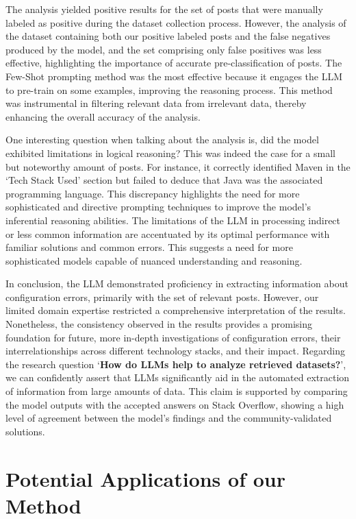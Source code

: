 \documentclass[english,bachelor]{swsLeipzig}
\begin{document}
The analysis yielded positive results for the set of posts that were manually labeled as positive during the dataset collection process. However, the analysis of the dataset containing both our positive labeled posts and the false negatives produced by the model, and the set comprising only false positives was less effective, highlighting the importance of accurate pre-classification of posts. The Few-Shot prompting method was the most effective because it engages the LLM to pre-train on some examples, improving the reasoning process. This method was instrumental in filtering relevant data from irrelevant data, thereby enhancing the overall accuracy of the analysis.

One interesting question when talking about the analysis is, did the model exhibited limitations in logical reasoning? This was indeed the case for a small but noteworthy amount of posts. For instance, it correctly identified Maven in 
the `Tech Stack Used' section but failed to deduce that Java was the associated programming language. This discrepancy highlights the need for more sophisticated and directive prompting techniques to improve the model's inferential reasoning abilities. The limitations of the LLM in processing indirect or less common information are accentuated by its optimal performance with familiar solutions and common errors. This suggests a need for more sophisticated models capable of nuanced understanding and reasoning.

In conclusion, the LLM demonstrated proficiency in extracting information about configuration errors, 
primarily with the set of relevant posts. However, our limited domain expertise restricted a comprehensive interpretation of the results. Nonetheless, the consistency observed in the results provides a promising foundation for future, more in-depth investigations of configuration errors, their interrelationships across different technology stacks, and their impact. Regarding the research question `\textbf{How do LLMs help to analyze retrieved datasets?}', we can confidently assert that LLMs significantly aid in the automated extraction of information from large amounts of data. This claim is supported by comparing the model outputs with the accepted answers on Stack Overflow, showing a high level of agreement between the model's findings and the community-validated solutions.

\section{Potential Applications of our Method}
\end{document}
